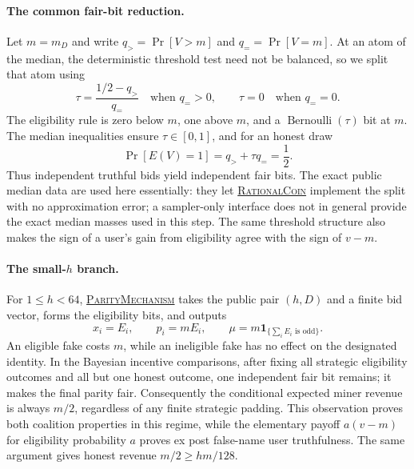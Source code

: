 \documentclass[11pt]{article}
\begin{document}
\paragraph{The common fair-bit reduction.}
Let $m=m_D$ and write $q_{>}=\Pr[V>m]$ and $q_{=}=\Pr[V=m]$.  At an atom of
the median, the deterministic threshold test need not be balanced, so we split
that atom using
\[
\tau=\frac{1/2-q_{>}}{q_{=}}
\quad\text{when }q_{=}>0,
\qquad \tau=0\quad\text{when }q_{=}=0.
\]
The eligibility rule is zero below $m$, one above $m$, and a
$\operatorname{Bernoulli}(\tau)$ bit at $m$.  The median inequalities ensure
$\tau\in[0,1]$, and for an honest draw
\[
\Pr[E(V)=1]=q_{>}+\tau q_{=} = \frac12.
\]
Thus independent truthful bids yield independent fair bits.  The exact public
median data are used here essentially: they let
\hyperref[alg:rational-coin]{\textsc{RationalCoin}} implement the split with
no approximation error; a sampler-only interface does not in general provide
the exact median masses used in this step.  The same threshold structure also
makes the sign of a user's gain from eligibility agree with the sign of
$v-m$.

\paragraph{The small-$h$ branch.}
For $1\le h<64$,
\hyperref[alg:parity-mechanism]{\textsc{ParityMechanism}} takes the public
pair $(h,D)$ and a finite bid vector, forms the eligibility bits, and outputs
\[
x_i=E_i,\qquad p_i=mE_i,\qquad
\mu=m\mathbf{1}_{\{\sum_iE_i\text{ is odd}\}}.
\]
An eligible fake costs $m$, while an ineligible fake has no effect on the
designated identity.  In the Bayesian incentive comparisons, after fixing all
strategic eligibility outcomes and all but one honest outcome, one independent
fair bit remains; it makes the final parity fair.  Consequently the conditional
expected miner revenue is always $m/2$, regardless of any finite strategic
padding.  This observation proves both coalition properties in this regime,
while the elementary payoff $a(v-m)$ for eligibility probability $a$ proves
ex post false-name user truthfulness.  The same argument gives honest revenue
$m/2\ge hm/128$.
\end{document}
